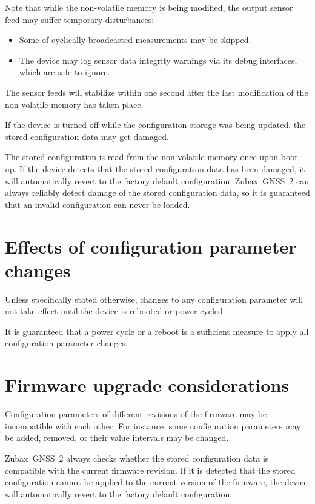 \documentclass{zubaxdoc}
\begin{document}
Note that while the non-volatile memory is being modified,
the output sensor feed may suffer temporary disturbances:
\begin{itemize}
    \item Some of cyclically broadcasted measurements may be skipped.
    \item The device may log sensor data integrity warnings via its debug interfaces, which are safe to ignore.
\end{itemize}
The sensor feeds will stabilize within one second after the last modification of the
non-volatile memory has taken place.

If the device is turned off while the configuration storage was being updated,
the stored configuration data may get damaged.

The stored configuration is read from the non-volatile memory once upon boot-up.
If the device detects that the stored configuration data has been damaged,
it will automatically revert to the factory default configuration.
Zubax~GNSS~2 can always reliably detect damage of the stored configuration data,
so it is guaranteed that an invalid configuration can never be loaded.

\section{Effects of configuration parameter changes}

Unless specifically stated otherwise, changes to any configuration parameter will not take effect until
the device is rebooted or power cycled.

It is guaranteed that a power cycle or a reboot is a sufficient measure to apply all configuration parameter
changes.

\section{Firmware upgrade considerations}

Configuration parameters of different revisions of the firmware may be incompatible with each other.
For instance, some configuration parameters may be added, removed, or their value intervals may be changed.

Zubax~GNSS~2 always checks whether the stored configuration data is compatible with the current
firmware revision.
If it is detected that the stored configuration cannot be applied to the current version of the firmware,
the device will automatically revert to the factory default configuration.
\end{document}
